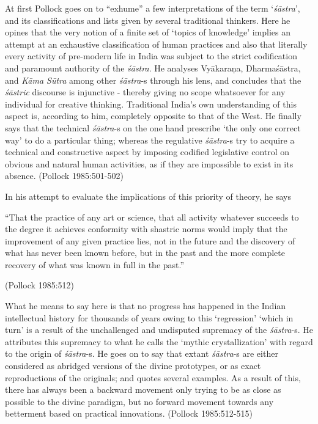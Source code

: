 At first Pollock goes on to ``exhume'' a few interpretations of the term `{\it śāstra}', and its classifications and lists given by several traditional thinkers. Here he opines that the very notion of a finite set of `topics of knowledge' implies an attempt at an exhaustive classification of human practices and also that literally every activity of pre-modern life in India was subject to the strict codification and paramount authority of the {\it śāstra}. He analyses Vyākaraṇa, Dharmaśāstra, and {\sl Kāma Sūtra} among other {\it śāstra}-s through his lens, and concludes that the {\sl śāstric} discourse is injunctive - thereby giving no scope whatsoever for any individual for creative thinking. Traditional India's own understanding of this aspect is, according to him, completely opposite to that of the West. He finally says that the technical {\it śāstra}-s on the one hand prescribe `the only one correct way' to do a particular thing;  whereas the regulative {\it śāstra}-s try to acquire a technical and constructive aspect by imposing codified legislative control on obvious and natural human activities, as if they are impossible to exist in its absence. (Pollock 1985:501-502)

In his attempt to evaluate the implications of this priority of theory, he says
\begin{myquote}
``That the practice of any art or science, that all activity whatever succeeds to the degree it achieves conformity with shastric norms would imply that the improvement of any given practice lies, not in the future and the discovery of what has never been known before, but in the past and the more complete recovery of what was known in full in the past.'' 

\hfill (Pollock 1985:512)
\end{myquote}

What he means to say here is that no progress has happened in the Indian intellectual history for thousands of years owing to this `regression' `which in turn' is a result of the unchallenged and undisputed supremacy of the {\it śāstra}-s. He attributes this supremacy to what he calls the `mythic crystallization' with regard to the origin of {\it śāstra}-s. He goes on to say that extant {\it śāstra}-s are either considered as abridged versions of the divine prototypes, or as exact reproductions of the originals; and quotes several examples. As a result of this, there has always been a backward movement only trying to be as close as possible to the divine paradigm, but no forward movement towards any betterment based on practical innovations. (Pollock 1985:512-515)


